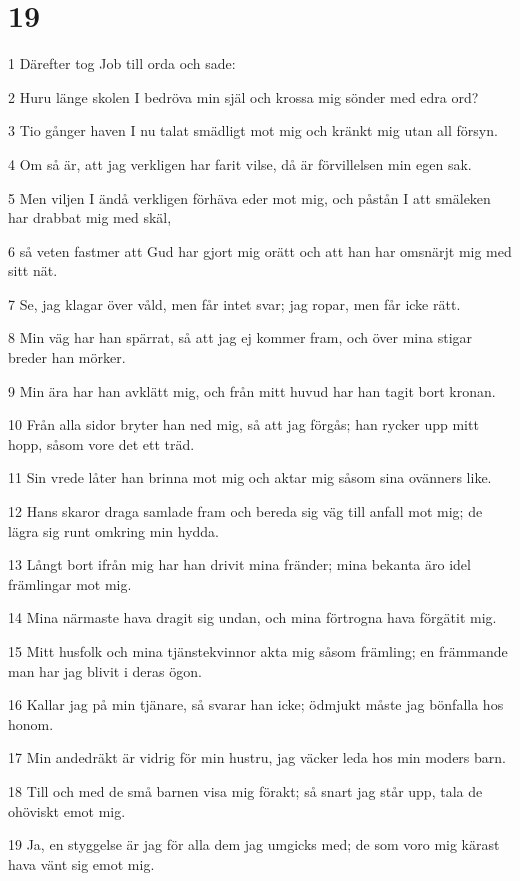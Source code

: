 \chapter{19}

\par 1 Därefter tog Job till orda och sade:
\par 2 Huru länge skolen I bedröva min själ och krossa mig sönder med edra ord?
\par 3 Tio gånger haven I nu talat smädligt mot mig och kränkt mig utan all försyn.
\par 4 Om så är, att jag verkligen har farit vilse, då är förvillelsen min egen sak.
\par 5 Men viljen I ändå verkligen förhäva eder mot mig, och påstån I att smäleken har drabbat mig med skäl,
\par 6 så veten fastmer att Gud har gjort mig orätt och att han har omsnärjt mig med sitt nät.
\par 7 Se, jag klagar över våld, men får intet svar; jag ropar, men får icke rätt.
\par 8 Min väg har han spärrat, så att jag ej kommer fram, och över mina stigar breder han mörker.
\par 9 Min ära har han avklätt mig, och från mitt huvud har han tagit bort kronan.
\par 10 Från alla sidor bryter han ned mig, så att jag förgås; han rycker upp mitt hopp, såsom vore det ett träd.
\par 11 Sin vrede låter han brinna mot mig och aktar mig såsom sina ovänners like.
\par 12 Hans skaror draga samlade fram och bereda sig väg till anfall mot mig; de lägra sig runt omkring min hydda.
\par 13 Långt bort ifrån mig har han drivit mina fränder; mina bekanta äro idel främlingar mot mig.
\par 14 Mina närmaste hava dragit sig undan, och mina förtrogna hava förgätit mig.
\par 15 Mitt husfolk och mina tjänstekvinnor akta mig såsom främling; en främmande man har jag blivit i deras ögon.
\par 16 Kallar jag på min tjänare, så svarar han icke; ödmjukt måste jag bönfalla hos honom.
\par 17 Min andedräkt är vidrig för min hustru, jag väcker leda hos min moders barn.
\par 18 Till och med de små barnen visa mig förakt; så snart jag står upp, tala de ohöviskt emot mig.
\par 19 Ja, en styggelse är jag för alla dem jag umgicks med; de som voro mig kärast hava vänt sig emot mig.
